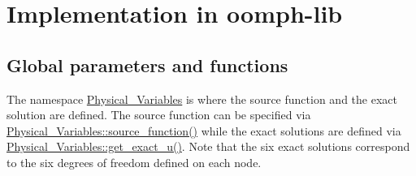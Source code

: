  

\hypertarget{index_impl}{}\section{Implementation in oomph-\/lib}\label{index_impl}


\hypertarget{index_global}{}\subsection{Global parameters and functions}\label{index_global}
The namespace {\ttfamily \hyperlink{namespacePhysical__Variables}{Physical\+\_\+\+Variables}} is where the source function and the exact solution are defined. The source function can be specified via {\ttfamily \hyperlink{namespacePhysical__Variables_ae11027d76c5f512b7db6a1b6d17dc792}{Physical\+\_\+\+Variables\+::source\+\_\+function()}} while the exact solutions are defined via {\ttfamily \hyperlink{namespacePhysical__Variables_af90d0c580c57b1152fd1cc7046055031}{Physical\+\_\+\+Variables\+::get\+\_\+exact\+\_\+u()}}. Note that the six exact solutions correspond to the six degrees of freedom defined on each node.


